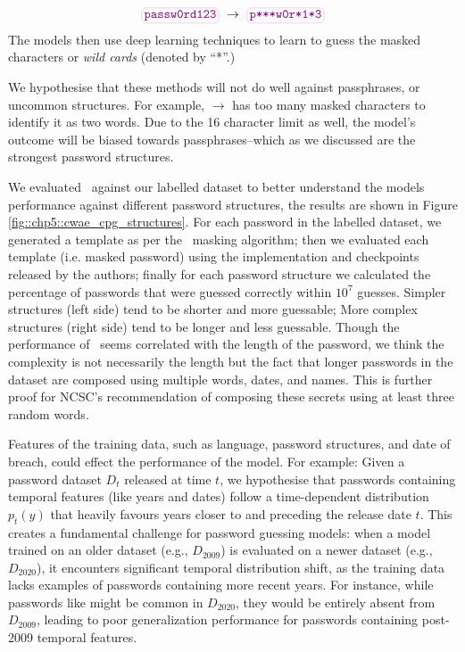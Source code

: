 \[
\text{\password{passw0rd123}} \rightarrow \text{\password{p***w0r*1*3}}
\]
The models then use deep learning techniques to learn to guess the masked characters or \textit{wild cards} (denoted by ``*''.)

We hypothesise that these methods will not do well against passphrases, or uncommon structures. For example,  $\rightarrow$  has too many masked characters to identify it as two words. Due to the 16 character limit as well, the model's outcome will be biased towards passphrases--which as we discussed are the strongest password structures.

We evaluated \cwaecpg\ against our labelled \hmail dataset to better understand the models performance against different password structures, the results are shown in Figure \ref{fig::chp5::cwae_cpg_structures}. For each password in the labelled \hmail dataset, we generated a template as per the \cwaecpg\ masking algorithm; then we evaluated each template (i.e. masked password) using the implementation and checkpoints released by the authors; finally for each password structure we calculated the percentage of passwords that were guessed correctly within $10^7$ guesses. Simpler structures (left side) tend to be shorter and more guessable; More complex structures (right side) tend to be longer and less guessable. Though the performance of \cwaecpgnocite\ seems correlated with the length of the password, we think the complexity is not necessarily the length but the fact that longer passwords in the dataset are composed using multiple words, dates, and names. This is further proof for NCSC's recommendation of composing these secrets using at least three random words.

Features of the training data, such as language, password structures, and date of breach, could effect the performance of the model. For example: Given a password dataset $D_t$ released at time $t$, we hypothesise that passwords containing temporal features (like years and dates) follow a time-dependent distribution $p_t(y)$ that heavily favours years closer to and preceding the release date $t$. This creates a fundamental challenge for password guessing models: when a model trained on an older dataset (e.g., $D_{2009}$) is evaluated on a newer dataset (e.g., $D_{2020}$), it encounters significant temporal distribution shift, as the training data lacks examples of passwords containing more recent years. For instance, while passwords like  might be common in $D_{2020}$, they would be entirely absent from $D_{2009}$, leading to poor generalization performance for passwords containing post-2009 temporal features.

